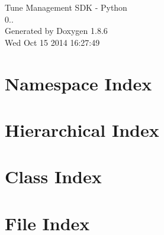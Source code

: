 \documentclass[twoside]{book}
\newcommand{\clearemptydoublepage}{%
  \newpage{\pagestyle{empty}\cleardoublepage}%
}
\begin{document}
\hypersetup{pageanchor=false}
\begin{titlepage}
\vspace*{7cm}
\begin{center}%
{\Large Tune Management S\-D\-K -\/ Python \\[1ex]\large 0.. }\\
\vspace*{1cm}
{\large Generated by Doxygen 1.8.6}\\
\vspace*{0.5cm}
{\small Wed Oct 15 2014 16:27:49}\\
\end{center}
\end{titlepage}
\clearemptydoublepage
\tableofcontents
\clearemptydoublepage
{}
\hypersetup{pageanchor=true}

\chapter{Namespace Index}

\chapter{Hierarchical Index}

\chapter{Class Index}

\chapter{File Index}

\end{document}
